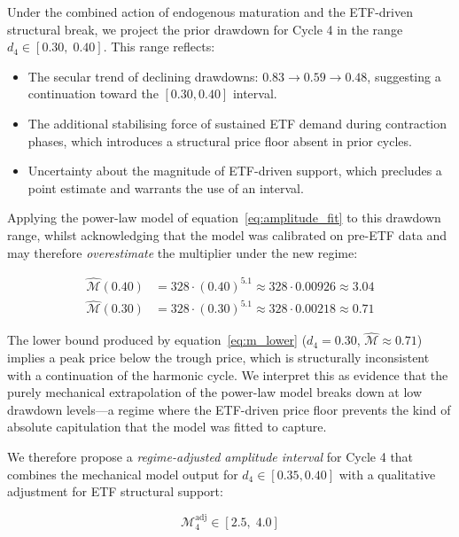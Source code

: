 Under the combined action of endogenous maturation and the ETF-driven
structural break, we project the prior drawdown for Cycle 4 in the range
$d_4 \in [0.30,\; 0.40]$. This range reflects:

\begin{itemize}
  \item The secular trend of declining drawdowns: $0.83 \to 0.59 \to 0.48$,
  suggesting a continuation toward the $[0.30, 0.40]$ interval.
  \item The additional stabilising force of sustained ETF demand during
  contraction phases, which introduces a structural price floor absent in
  prior cycles.
  \item Uncertainty about the magnitude of ETF-driven support, which precludes
  a point estimate and warrants the use of an interval.
\end{itemize}

Applying the power-law model of equation~\eqref{eq:amplitude_fit} to this
drawdown range, whilst acknowledging that the model was calibrated on
pre-ETF data and may therefore \textit{overestimate} the multiplier under the
new regime:

\begin{align}
  \hat{\mathcal{M}}(0.40) &= 328 \cdot (0.40)^{5.1}
    \approx 328 \cdot 0.00926 \approx 3.04 \label{eq:m_upper} \\[4pt]
  \hat{\mathcal{M}}(0.30) &= 328 \cdot (0.30)^{5.1}
    \approx 328 \cdot 0.00218 \approx 0.71 \label{eq:m_lower}
\end{align}

The lower bound produced by equation~\eqref{eq:m_lower} ($d_4 = 0.30$,
$\hat{\mathcal{M}} \approx 0.71$) implies a peak price below the trough price,
which is structurally inconsistent with a continuation of the harmonic cycle.
We interpret this as evidence that the purely mechanical extrapolation of the
power-law model breaks down at low drawdown levels---a regime where the
ETF-driven price floor prevents the kind of absolute capitulation that the
model was fitted to capture.

We therefore propose a \textit{regime-adjusted amplitude interval} for Cycle 4
that combines the mechanical model output for $d_4 \in [0.35, 0.40]$ with a
qualitative adjustment for ETF structural support:

\begin{equation}
  \mathcal{M}_4^{\text{adj}} \in [2.5,\; 4.0]
  \label{eq:m4_adjusted}
\end{equation}

